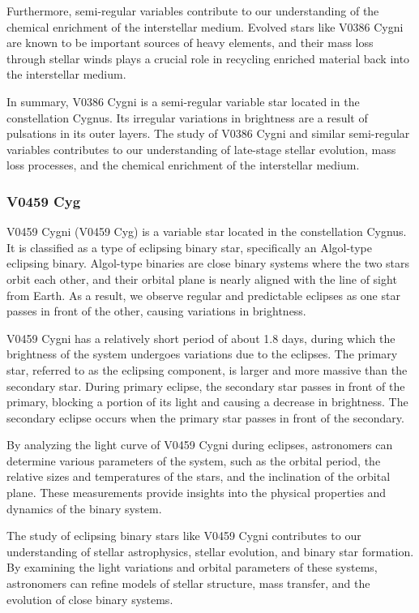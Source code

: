 Furthermore, semi-regular variables contribute to our understanding of the chemical enrichment of the interstellar medium. Evolved stars like V0386 Cygni are known to be important sources of heavy elements, and their mass loss through stellar winds plays a crucial role in recycling enriched material back into the interstellar medium.

In summary, V0386 Cygni is a semi-regular variable star located in the constellation Cygnus. Its irregular variations in brightness are a result of pulsations in its outer layers. The study of V0386 Cygni and similar semi-regular variables contributes to our understanding of late-stage stellar evolution, mass loss processes, and the chemical enrichment of the interstellar medium.


\subsubsection*{ V0459 Cyg }
V0459 Cygni (V0459 Cyg) is a variable star located in the constellation Cygnus. It is classified as a type of eclipsing binary star, specifically an Algol-type eclipsing binary. Algol-type binaries are close binary systems where the two stars orbit each other, and their orbital plane is nearly aligned with the line of sight from Earth. As a result, we observe regular and predictable eclipses as one star passes in front of the other, causing variations in brightness.

V0459 Cygni has a relatively short period of about 1.8 days, during which the brightness of the system undergoes variations due to the eclipses. The primary star, referred to as the eclipsing component, is larger and more massive than the secondary star. During primary eclipse, the secondary star passes in front of the primary, blocking a portion of its light and causing a decrease in brightness. The secondary eclipse occurs when the primary star passes in front of the secondary.

By analyzing the light curve of V0459 Cygni during eclipses, astronomers can determine various parameters of the system, such as the orbital period, the relative sizes and temperatures of the stars, and the inclination of the orbital plane. These measurements provide insights into the physical properties and dynamics of the binary system.

The study of eclipsing binary stars like V0459 Cygni contributes to our understanding of stellar astrophysics, stellar evolution, and binary star formation. By examining the light variations and orbital parameters of these systems, astronomers can refine models of stellar structure, mass transfer, and the evolution of close binary systems.

